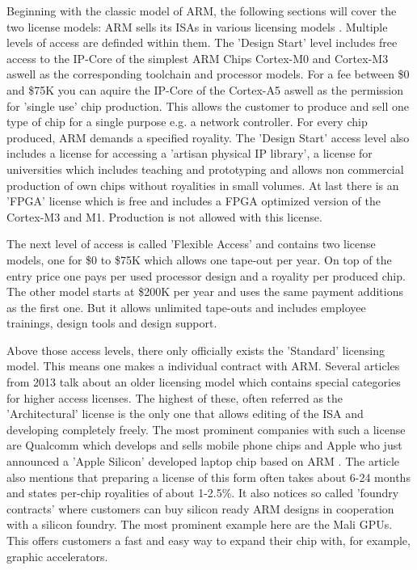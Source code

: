 \documentclass[conference]{IEEEtran}
\begin{document}
	Beginning with the classic model of ARM, the following sections will cover the two license models: ARM sells its \glspl{ISA} in various licensing models \cite{ARMLC}. Multiple levels of access are definded within them. The 'Design Start' level includes free access to the IP-Core of the simplest ARM Chips Cortex-M0 and Cortex-M3 aswell as the corresponding toolchain and processor models. For a fee between \$0 and \$75K \cite{ARMLC} you can aquire the IP-Core of the Cortex-A5 aswell as the permission for 'single use' chip production. This allows the customer to produce and sell one type of chip for a single purpose e.g. a network controller. For every chip produced, ARM demands a specified royality. The 'Design Start' access level also includes a license for accessing a 'artisan physical IP library', a license for universities which includes teaching and prototyping and allows non commercial production of own chips without royalities in small volumes. At last there is an '\acrshort{FPGA}' license which is free and includes a \gls{FPGA} optimized version of the Cortex-M3 and M1. Production is not allowed with this license.

	The next level of access is called 'Flexible Access' and contains two license models, one for \$0 to \$75K which allows one tape-out per year. On top of the entry price one pays per used processor design and a royality per produced chip. The other model starts at \$200K per year and uses the same payment additions as the first one. But it allows unlimited tape-outs and includes employee trainings, design tools and design support.

	Above those access levels, there only officially exists the 'Standard' licensing model. This means one makes a individual contract with ARM.
	Several articles from 2013 \cite{Demerjian2013}\cite{Demerjian2013a} talk about an older licensing model which contains special categories for higher access licenses. The highest of these, often referred as the 'Architectural' license is the only one that allows editing of the \gls{ISA} and developing completely freely. The most prominent companies with such a license are Qualcomm which develops and sells mobile phone chips and Apple who just announced a 'Apple Silicon' developed laptop chip based on ARM \cite{Apple2020}. The article also mentions that preparing a license of this form often takes about 6-24 months and states per-chip royalities of about 1-2.5\%. It also notices so called 'foundry contracts' where customers can buy silicon ready ARM designs in cooperation with a silicon foundry. The most prominent example here are the Mali GPUs. This offers customers a fast and easy way to expand their chip with, for example, graphic accelerators.
\end{document}
